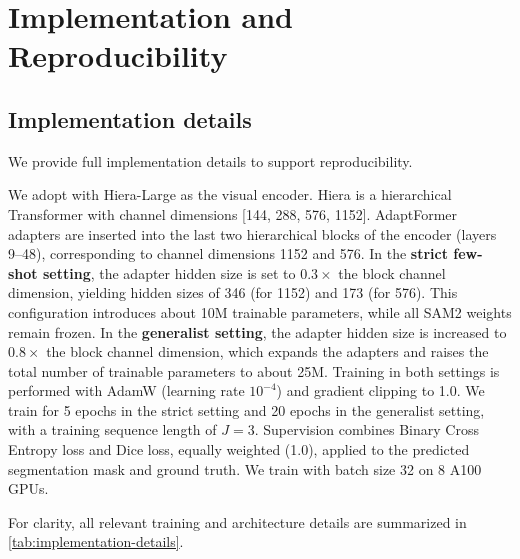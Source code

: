 \section{Implementation and Reproducibility}
\label{sec:supp_implementation}

\subsection{Implementation details}
We provide full implementation details to support reproducibility.

We adopt \ours{} with Hiera-Large \cite{ryali2023hiera} as the visual encoder. Hiera is a hierarchical Transformer with channel dimensions [144, 288, 576, 1152]. AdaptFormer \cite{chen2022adaptformer} adapters are inserted into the last two hierarchical blocks of the encoder (layers 9–48), corresponding to channel dimensions 1152 and 576. In the \textbf{strict few-shot setting}, the adapter hidden size is set to $0.3\times$ the block channel dimension, yielding hidden sizes of 346 (for 1152) and 173 (for 576). This configuration introduces about 10M trainable parameters, while all SAM2 weights remain frozen. In the \textbf{generalist setting}, the adapter hidden size is increased to $0.8\times$ the block channel dimension, which expands the adapters and raises the total number of trainable parameters to about 25M. Training in both settings is performed with AdamW (learning rate $10^{-4}$) and gradient clipping to 1.0. We train for 5 epochs in the strict setting and 20 epochs in the generalist setting, with a training sequence length of $J{=}3$. Supervision combines Binary Cross Entropy loss and Dice loss, equally weighted (1.0), applied to the predicted segmentation mask and ground truth. We train with batch size 32 on 8 A100 GPUs.

For clarity, all relevant training and architecture details are summarized in \cref{tab:implementation-details}.

